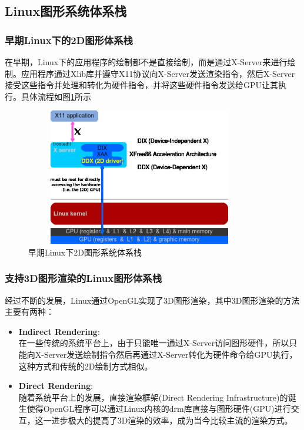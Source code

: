 
\subsection{Linux图形系统体系栈}
\subsubsection{早期Linux下的2D图形体系栈}
在早期，Linux下的应用程序的绘制都不是直接绘制，而是通过X-Server来进行绘制。应用程序通过Xlib库并遵守X11协议向X-Server发送渲染指令，然后X-Server接受这些指令并处理和转化为硬件指令，并将这些硬件指令发送给GPU让其执行。具体流程如图\ref{fig:2D-Graph-Stack}所示

\begin{figure}[H] 
  \centering
  \includegraphics[width=10cm,height=6cm]{figures/chap01/Linux_graphics_drivers_2D}
  \caption{早期Linux下2D图形系统体系栈}
  \label{fig:2D-Graph-Stack}
\end{figure}

\subsubsection{支持3D图形渲染的Linux图形体系栈}
经过不断的发展，Linux通过OpenGL实现了3D图形渲染，其中3D图形渲染的方法主要有两种：
\begin{itemize}
\item{\textbf{Indirect Rendering}}: \\
在一些传统的系统平台上，由于只能唯一通过X-Server访问图形硬件，所以只能向X-Server发送绘制指令然后再通过X-Server转化为硬件命令给GPU执行，这种方式和传统的2D绘制方式相似。
\item{\textbf{Direct Rendering}}: \\ 
随着系统平台上的发展，直接渲染框架(Direct Rendering Infrastructure)的诞生使得OpenGL程序可以通过Linux内核的drm库直接与图形硬件(GPU)进行交互，这一进步极大的提高了3D渲染的效率，成为当今比较主流的渲染方式。
\end{itemize}

